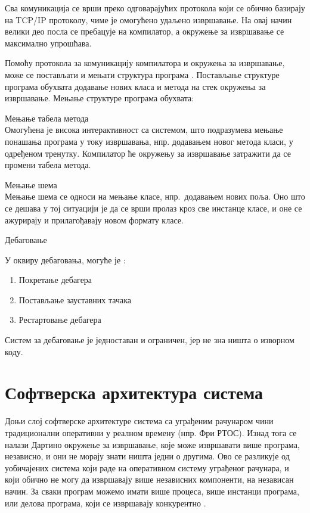 \documentclass[12pt,oneside]{memoir}
\begin{document}
Сва комуникација се врши преко одговарајућих протокола који се обично базирају на TCP/IP протоколу, чиме је омогућено удаљено извршавање. На овај начин велики део посла се пребацује на компилатор, а окружење за извршавање се максимално упрошћава.

Помоћу протокола за комуникацију компилатора и окружења за извршавање, може се постављати и мењати структура програма \cite{Dartino}.
Постављање структуре програма обухвата додавање нових класа и метода на стек окружења за извршавање.
Мењање структуре програма обухвата:
\begin{description}
\item Мењање табела метода\\
Омогућена је висока интерактивност са системом, што подразумева мењање понашања програма у току извршавања, нпр. додавањем новог метода класи, у одређеном тренутку. Компилатор ће окружењу за извршавање затражити да се промени табела метода.
\item Мењање шема\\
Мењање шема се односи на мењање класе, нпр.~додавањем нових поља. Оно што се дешава у тој ситуацији је да се врши пролаз кроз све инстанце класе, и оне се ажурирају и прилагођавају новом формату класе.
\item Дебаговање

У оквиру дебаговања, могуће је \cite{Dartino}:
\begin{enumerate}
\item Покретање дебагера
\item Постављање зауставних тачака
\item Рестартовање дебагера
\end{enumerate}
Систем за дебаговање је једноставан и ограничен, јер не зна ништа о изворном коду.
\end{description}
\section{Софтверска архитектура система}
\label{arhitektura}

Доњи слој софтверске архитектуре система са уграђеним рачунаром чини традиционални оперативни у реалном времену (нпр. Фри РТОС). Изнад тога се налази Дартино окружење за извршавање, које може извршавати више програма, независно, и они не морају знати ништа једни о другима. Ово се разликује од уобичајених система који раде на оперативном систему уграђеног рачунара, и који обично не могу да извршавају више независних компоненти, на независан начин. За сваки програм можемо имати више процеса, више инстанци програма, или делова програма, који се извршавају конкурентно \cite{Dartino}.
\end{document}
